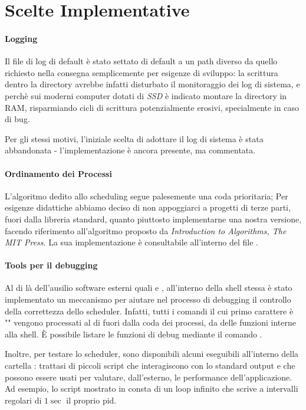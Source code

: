 \documentclass[11pt]{article}
\begin{document}
\section{Scelte Implementative}

\paragraph{Logging\\}
Il file di log di default \`e stato settato di default a un path diverso da
quello richiesto nella consegna semplicemente per esigenze di sviluppo: la
scrittura dentro la directory  avrebbe infatti disturbato il
monitoraggio dei log di sistema, e perch\`e sui moderni computer dotati di
\emph{SSD} \`e indicato montare la directory  in RAM, risparmiando
cicli di scrittura potenzialmente erosivi, specialmente in caso di bug.

Per gli stessi motivi, l'iniziale scelta di adottare il log di sistema
 \`e stata abbandonata - l'implementazione \`e ancora presente, ma
commentata.

\paragraph{Ordinamento dei Processi\\}
L'algoritmo dedito allo scheduling segue palesemente una coda prioritaria;
Per esigenze didattiche abbiamo deciso di non appoggiarci a progetti di terze
parti, fuori dalla libreria standard, quanto piuttosto implementarne una nostra versione,
facendo riferimento all'algoritmo proposto da \emph{Introduction to Algorithms, The MIT Press}.
La sua implementazione \`e consultabile all'interno del file .

\paragraph{Tools per il debugging\\}
Al di l\`a dell'ausilio software esterni quali  e ,
all'interno della shell stessa \`e stato implementato un meccanismo per aiutare
nel processo di debugging il controllo della correttezza dello scheduler.
Infatti, tutti i comandi il cui primo carattere \`e "\code{\%}" vengono processati
al di fuori dalla coda dei processi, da delle funzioni interne alla shell.
\`E possibile listare le funzioni di debug mediante il comando .

Inoltre, per testare lo scheduler, sono disponibili alcuni eseguibili all'interno della
cartella : trattasi di piccoli script che interagiscono con lo standard
output e che possono essere usati per valutare, dall'esterno, le performance dell'applicazione.
Ad esempio, lo script  mostrato in  consta di un
loop infinito che scrive a intervalli regolari di $1\sec$ il proprio pid.
\end{document}
